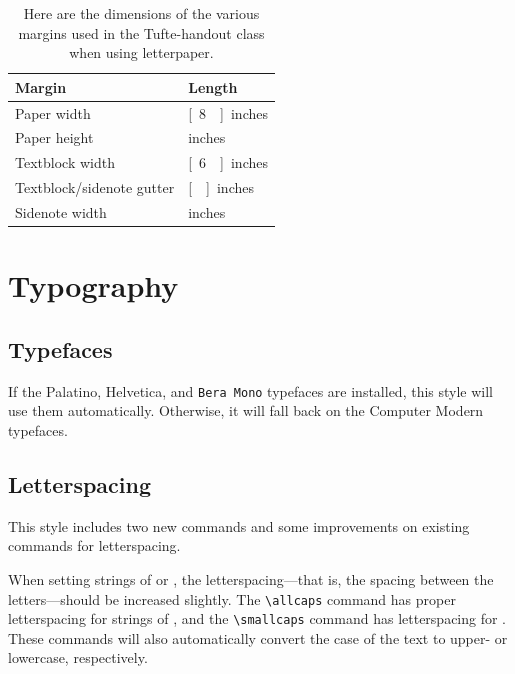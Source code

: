 \documentclass[letter]{tufte-handout} %
\begin{document}
\begin{table}[ht]
	\centering
	\selectfont
	\begin{tabular}{l l}
		\toprule
		Margin                    & Length                          \\
		\midrule
		Paper width               & \unit[8\nicefrac{1}{2}]{inches} \\
		Paper height              & \unit[11]{inches}               \\
		Textblock width           & \unit[6\nicefrac{1}{2}]{inches} \\
		Textblock/sidenote gutter & \unit[\nicefrac{3}{8}]{inches}  \\
		Sidenote width            & \unit[2]{inches}                \\
		\bottomrule
	\end{tabular}
	\caption{Here are the dimensions of the various margins used in the Tufte-handout class when using letterpaper.}
	\label{tab:normaltab}
\end{table}


\section{Typography}\label{sec:typography}

\subsection{Typefaces}\label{sec:typefaces}

If the Palatino, \textsf{Helvetica}, and \texttt{Bera Mono} typefaces are installed, this style will use them automatically. Otherwise, it will fall back on the Computer Modern typefaces.

\subsection{Letterspacing}\label{sec:letterspacing}

This style includes two new commands and some improvements on existing commands for letterspacing.

When setting strings of  or , the letter\-spacing---that is, the spacing between the letters---should be increased slightly\cite[-0.25cm]{Bringhurst2005}. The \texttt{\textbackslash allcaps} command has proper letterspacing for strings of , and the \texttt{\textbackslash smallcaps} command has letterspacing for . These commands will also automatically convert the case of the text to upper- or lowercase, respectively.
\end{document}
